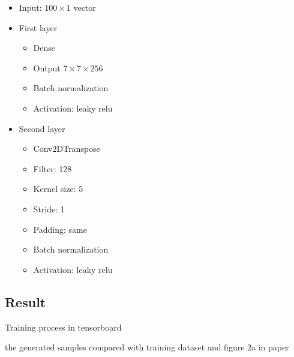 \documentclass{article}
\begin{document}
\begin{itemize}
  \item Input: $100 \times 1$ vector
  \item First layer
    \begin{itemize}
      \item Dense
      \item Output $7\times 7\times 256$
      \item Batch normalization \checkmark
      \item Activation: leaky relu
    \end{itemize}
  \item Second layer
    \begin{itemize}
      \item Conv2DTranspose
      \item Filter: 128
      \item Kernel size: 5
      \item Stride: 1
      \item Padding: same
      \item Batch normalization \checkmark
      \item Activation: leaky relu
    \end{itemize}   
\end{itemize}

\subsection{Result}

Training process in tensorboard

the generated samples compared with training dataset and figure 2a in paper
\end{document}

